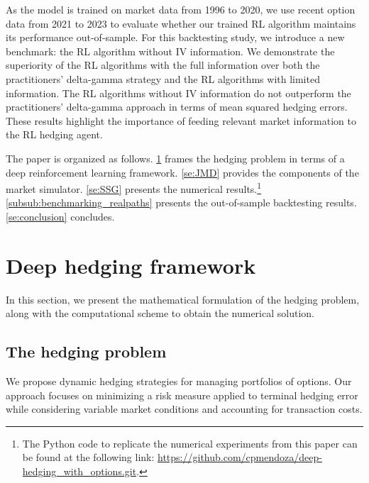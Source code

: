 \documentclass[12pt]{article}
\begin{document}
As the model is trained on market data from 1996 to 2020, we use recent option data from 2021 to 2023 to evaluate whether our trained RL algorithm maintains its performance out-of-sample. For this backtesting study, we introduce a new benchmark: the RL algorithm without IV information. We demonstrate the superiority of the RL algorithms with the full information over both the practitioners’ delta-gamma strategy and the RL algorithms with limited information. The RL algorithms without IV information do not outperform the practitioners’ delta-gamma approach in terms of mean squared hedging errors. These results highlight the importance of feeding relevant market information to the RL hedging agent.


The paper is organized as follows. \cref{se:hedgepro} frames the hedging problem in terms of a deep reinforcement learning framework. \cref{se:JMD} provides the components of the market simulator. \cref{se:SSG} presents the numerical results.\footnote{The Python code to replicate the numerical experiments from this paper can be found at the following link: \mbox{\href{https://github.com/cpmendoza/deep-hedging_with_options.git}{https://github.com/cpmendoza/deep-hedging\_with\_options.git}.}} \cref{subsub:benchmarking_realpaths} presents the out-of-sample backtesting results. \cref{se:conclusion} concludes.












\section{Deep hedging framework}\label{se:hedgepro}

In this section, we present the mathematical formulation of the hedging problem, along with the computational scheme to obtain the numerical solution.

\subsection{The hedging problem}\label{subse:hedgepro_formulation}
We propose dynamic hedging strategies for managing portfolios of options. Our approach focuses on minimizing a risk measure applied to terminal hedging error while considering variable market conditions and accounting for transaction costs.
\end{document}
